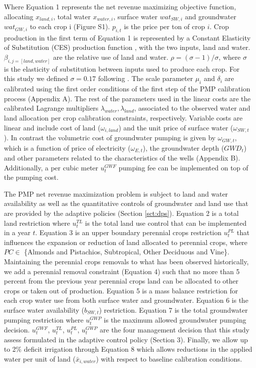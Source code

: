\documentclass[a4paper,fleqn]{cas-sc}
\begin{document}
Where Equation 1 represents the net revenue maximizing objective function, allocating $x_{land,i}$, total water $x_{water,i}$, surface water $wat_{SW,i}$ and groundwater $wat_{GW,i}$ to each crop i (Figure S1). $p_{i,t}$ is the price per ton of crop $i$. Crop production in the first term of Equation 1 is represented by a Constant Elasticity of Substitution (CES) production function \citep{debertin_agricultural_2012,merel_fully_2010}, with the two inputs, land and water.  $\beta_{i,j=[land,water]}$ are the relative use of land and water. $\rho = (\sigma-1)/\sigma$, where $\sigma$ is the elasticity of substitution between inputs used to produce each crop. For this study we defined $\sigma = 0.17$ following \citet{howitt_calibrating_2012}. The scale parameter $\mu_{i}$ and $\delta_{i}$ are calibrated using the first order conditions of the first step of the PMP calibration process (Appendix A). The rest of the parameters used in the linear costs are the calibrated Lagrange multipliers $\lambda_{water},\lambda_{land}$, associated to the observed water and land allocation per crop calibration constraints, respectively. Variable costs are linear and include cost of land ($\omega_{i,land}$) and the unit price of surface water ($\omega_{SW,t}$). In contrast the volumetric cost of groundwater pumping is given by $\omega_{GW,t}$, which is a function of price of electricity ($\omega_{E,t}$), the groundwater depth ($GWD_t$) and other parameters related to the characteristics of the wells (Appendix B). Additionally, a per cubic meter $u^{GWF}_{t}$ pumping fee can be implemented on top of the pumping cost.

The PMP net revenue maximization problem is subject to land and water availability as well as the quantitative controls of groundwater and land use that are provided by the adaptive policies (Section \ref{sct:dps}). Equation 2 is a total land restriction where $u^{TL}_{t}$ is the total land use control that can be implemented in a year $t$. Equation 3 is an upper boundary perennial crops restriction $u^{PL}_{t}$ that influences the expansion or reduction of land allocated to perennial crops, where $PC \in$ \{Almonds and Pistachios, Subtropical, Other Deciduous and Vine\}. Maintaining the perennial crops removals to what has been observed historically, we add a perennial removal constraint (Equation 4) such that no more than 5 percent from the previous year perennial crops land can be allocated to other crops or taken out of production. Equation 5 is a mass balance restriction for each crop water use from both surface water and groundwater. Equation 6 is the surface water availability ($b_{SW,t}$) restriction. Equation 7 is the total groundwater pumping restriction where $u^{GWP}_{t}$ is the maximum allowed groundwater pumping decision. $u^{GWF}_{t}$, $u^{TL}_{t}$, $u^{PL}_{t}$, $u^{GWP}_{t}$ are the four management decision that this study assess formulated in the adaptive control policy (Section  3).  Finally, we allow up to 2\% deficit irrigation through Equation 8 which allows reductions in the applied water per  unit of land ($\bar{x}_{i,water}$) with respect to baseline calibration conditions. 
\end{document}

